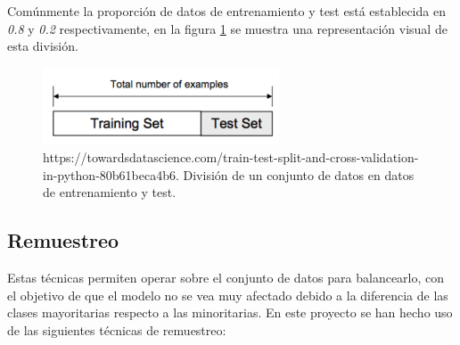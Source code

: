 \begin{enumerate}
                    Comúnmente la proporción de datos de entrenamiento y test está establecida en \textit{0.8} y \textit{0.2} respectivamente, en la figura \ref{DataSplitImage} se muestra una representación visual de esta división.


                    \begin{figure}[h]
                        \centering
                        \includegraphics[width=7cm]{archivos/4.Metodologia/Datos/Separacion/DataSplit}
                        \caption{https://towardsdatascience.com/train-test-split-and-cross-validation-in-python-80b61beca4b6. División de un conjunto de datos en datos de entrenamiento y test.}
                        \label{DataSplitImage}
                     \end{figure}

            \end{enumerate}



        \subsection{Remuestreo}


            Estas técnicas permiten operar sobre el conjunto de datos para balancearlo, con el objetivo de que el modelo no se vea muy afectado debido a la diferencia de las clases mayoritarias respecto a las minoritarias. En este proyecto se han hecho uso de las siguientes técnicas de remuestreo:

